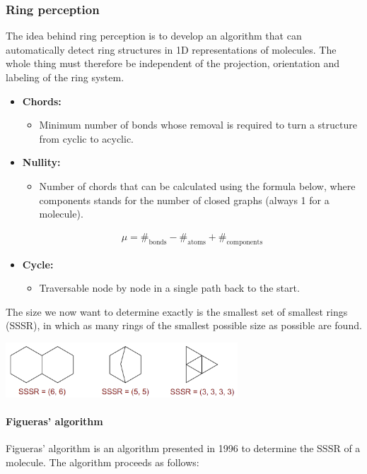 \subsubsection{Ring perception}

The idea behind ring perception is to develop an algorithm that can automatically detect ring structures in 1D representations of molecules. The whole thing must therefore be independent of the projection, orientation and labeling of the ring system.

\begin{itemize}
    \item \textbf{Chords:}
    \begin{itemize}
        \item Minimum number of bonds whose removal is required to turn a structure from cyclic to acyclic.
    \end{itemize}
    \item \textbf{Nullity:}
    \begin{itemize}
        \item Number of chords that can be calculated using the formula below, where components stands for the number of closed graphs (always 1 for a molecule).
    \end{itemize}
    \begin{align}
        \mu=\#_\mathrm{bonds}-\#_\mathrm{atoms}+\#_\mathrm{components}
    \end{align}
    \item \textbf{Cycle:}
    \begin{itemize}
        \item Traversable node by node in a single path back to the start.
    \end{itemize}
\end{itemize}

The size we now want to determine exactly is the smallest set of smallest rings (SSSR), in which as many rings of the smallest possible size as possible are found. 

\begin{center}
    \includegraphics[width=0.65\textwidth]{img/cheminformatics/RingPerceptionSssr.png}
\end{center}

\paragraph{Figueras' algorithm}
Figueras' algorithm is an algorithm presented in 1996 to determine the SSSR of a molecule. The algorithm proceeds as follows:


